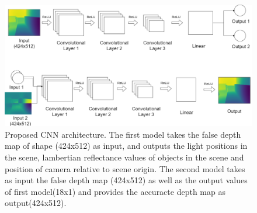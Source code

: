 \documentclass[runningheads]{llncs}
\begin{document}
\begin{figure}
    \centering
    \includegraphics[scale=0.25]{img/NN-model/CNN2.png}
    \caption{Proposed CNN architecture. The first model takes the false depth map of shape (424x512) as input, and outputs the light positions in the scene, lambertian reflectance values of objects in the scene and position of camera relative to scene origin. The second model takes as input the false depth map (424x512) as well as the output values of first model(18x1) and provides the accuracte depth map as output(424x512). }
    \label{fig:result_raw}
\end{figure}
\end{document}
